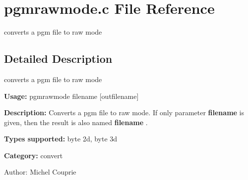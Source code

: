 \section{pgmrawmode.c File Reference}
\label{pgmrawmode_8c}
converts a pgm file to raw mode 



\subsection{Detailed Description}
converts a pgm file to raw mode 

{\bf Usage:} pgmrawmode filename [outfilename]

{\bf Description:} Converts a pgm file to raw mode. If only parameter {\bf filename} is given, then the result is also named {\bf filename} .

{\bf Types supported:} byte 2d, byte 3d

{\bf Category:} convert

\begin{Desc}
\item[Author:]Michel Couprie \end{Desc}
